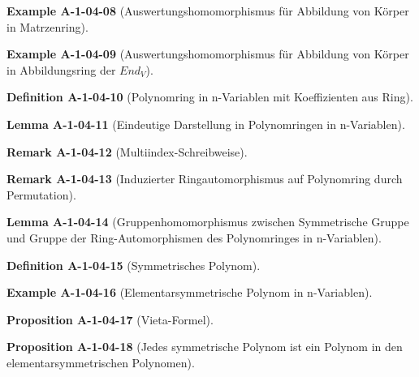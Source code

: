 \documentclass[10pt, letterpaper]{article}
\newcommand{\CustomHeading}[3]{%
  \par\medskip\noindent%
  \textbf{#1 #2} \textnormal{(#3)}.\enskip%
}
\newenvironment{DEF}[2]{\CustomHeading{Definition}{#1}{#2}}{}
\newenvironment{PROP}[2]{\CustomHeading{Proposition}{#1}{#2}}{}
\newenvironment{LEM}[2]{\CustomHeading{Lemma}{#1}{#2}}{}
\newenvironment{REM}[2]{\CustomHeading{Remark}{#1}{#2}}{}
\newenvironment{EXA}[2]{\CustomHeading{Example}{#1}{#2}}{}
\begin{document}
\begin{EXA}{A-1-04-08}{Auswertungshomomorphismus für Abbildung von Körper in Matrzenring}
\end{EXA}

\begin{EXA}{A-1-04-09}{Auswertungshomomorphismus für Abbildung von Körper in Abbildungsring der $End_V$}
\end{EXA}

\begin{DEF}{A-1-04-10}{Polynomring in n-Variablen mit Koeffizienten aus Ring}
\end{DEF}

\begin{LEM}{A-1-04-11}{Eindeutige Darstellung in Polynomringen in n-Variablen}
\end{LEM}

\begin{REM}{A-1-04-12}{Multiindex-Schreibweise}
\end{REM}

\begin{REM}{A-1-04-13}{Induzierter Ringautomorphismus auf Polynomring durch Permutation}
\end{REM}

\begin{LEM}{A-1-04-14}{Gruppenhomomorphismus zwischen Symmetrische Gruppe und Gruppe der Ring-Automorphismen des Polynomringes in n-Variablen}
\end{LEM}

\begin{DEF}{A-1-04-15}{Symmetrisches Polynom}
\end{DEF}

\begin{EXA}{A-1-04-16}{Elementarsymmetrische Polynom in n-Variablen}
\end{EXA}

\begin{PROP}{A-1-04-17}{Vieta-Formel}
\end{PROP}

\begin{PROP}{A-1-04-18}{Jedes symmetrische Polynom ist ein Polynom in den elementarsymmetrischen Polynomen}
\end{PROP}
\end{document}
